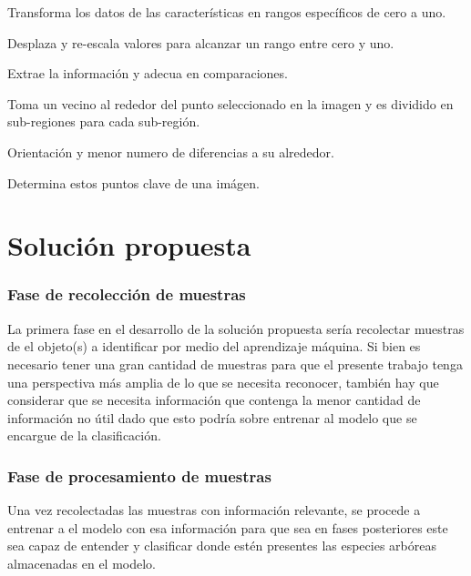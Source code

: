 \documentclass[a0,portrait]{a0poster}
\begin{document}
\begin{multicols}{2}
\begin{description}
\footnotesize \item[Escalamiento:]{Transforma los datos de las características en rangos específicos de cero a uno.}
\item[Normalización:]{Desplaza y re-escala valores para alcanzar un rango entre cero y uno.}

\item[Escala invariante (SIFT):]{Extrae la información y adecua en comparaciones.}

\item[Acelarado robusto (SURF):]{Toma un vecino al rededor del punto seleccionado en la imagen y es dividido en sub-regiones para cada sub-región.}

\item[Característica de diferencias en forma de cadena binaria (BRIEF):]{Orientación y menor numero de diferencias a su alrededor.}

\item[ORB* Rotada y orientada rápida:]{Determina estos puntos clave de una imágen.}
\end{description}

\section*{Solución propuesta}
\subsubsection*{Fase de recolección de muestras}
La primera fase en el desarrollo de la solución propuesta sería recolectar muestras de el objeto(s) a identificar por medio del aprendizaje máquina. Si bien es necesario tener una gran cantidad de muestras para que el presente trabajo tenga una perspectiva más amplia de lo que se necesita reconocer, también hay que considerar que se necesita información que contenga la menor cantidad de información no útil dado que esto podría sobre entrenar al modelo que se encargue de la clasificación.

\subsubsection*{Fase de procesamiento  de muestras}
Una vez recolectadas las muestras con información relevante, se procede a  entrenar a el modelo con esa información para que sea en fases posteriores este sea capaz de entender y clasificar donde estén presentes las especies arbóreas almacenadas en el modelo.


\end{multicols}
\end{document}
